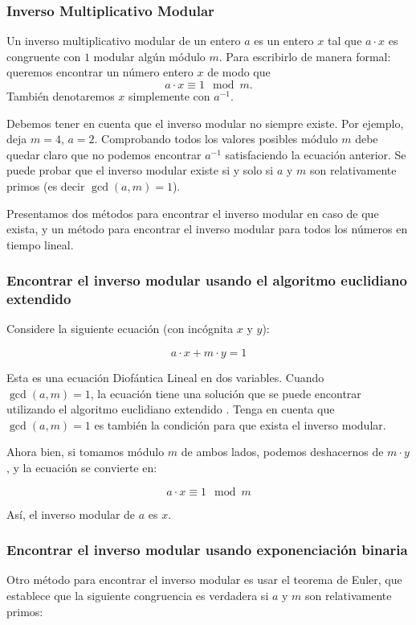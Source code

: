 \subsubsection{Inverso Multiplicativo Modular } 

Un inverso multiplicativo modular de un entero $a$ es un entero $x$ tal que  $a\cdot x$ es congruente con $1$ modular algún módulo $m$. Para escribirlo 
de manera formal: queremos encontrar un número entero $x$ de modo que $$a 
\cdot x \equiv 1 \mod m.$$ También denotaremos $x$ simplemente con $a^{-1}$.


Debemos tener en cuenta que el inverso modular no siempre existe. Por ejemplo, deja $m=4$, $a=2$. Comprobando todos los valores posibles 
módulo $m$ debe quedar claro que no podemos encontrar $a^{-1}$ satisfaciendo la ecuación anterior. Se puede probar que el inverso modular 
existe si y solo si $a$ y $m$ son relativamente primos (es decir $\gcd(a, m) = 1$).

Presentamos dos métodos para encontrar el inverso modular en caso de que exista, y un método para encontrar el inverso modular para todos los números en tiempo lineal.

\subsubsection{Encontrar el inverso modular usando el algoritmo euclidiano extendido}

Considere la siguiente ecuación (con incógnita $x$ y $y$):

$$a \cdot x + m \cdot y = 1$$

Esta es una ecuación Diofántica Lineal en dos variables. Cuando $\gcd(a, m) = 1$, la ecuación tiene una solución que se puede encontrar utilizando el algoritmo euclidiano extendido . Tenga en cuenta que $\gcd(a, m) = 1$ es también la condición para que exista el inverso modular.

Ahora bien, si tomamos módulo $m$ de ambos lados, podemos deshacernos de $m \cdot y$, y la ecuación se convierte en:

$$a \cdot x \equiv 1 \mod m$$

Así, el inverso modular de $a$ es $x$.

\subsubsection{Encontrar el inverso modular usando exponenciación binaria}

Otro método para encontrar el inverso modular es usar el teorema de Euler, que establece que la siguiente congruencia es verdadera si $a$ y $m$ son relativamente primos:

